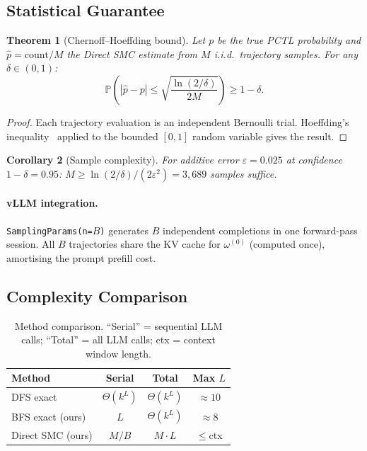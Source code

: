 \documentclass{article}
\newtheorem{theorem}{Theorem}
\newtheorem{corollary}[theorem]{Corollary}
\newcommand{\Prob}{\mathbb{P}}
\newcommand{\eps}{\varepsilon}
\begin{document}
\subsection{Statistical Guarantee}

\begin{theorem}[Chernoff--Hoeffding bound]
\label{thm:chernoff}
Let $p$ be the true PCTL probability and $\hat{p} = \text{count}/M$ the Direct
SMC estimate from $M$ i.i.d.\ trajectory samples.
For any $\delta \in (0,1)$:
\[
  \Prob\!\left(|\hat{p} - p| \le \sqrt{\frac{\ln(2/\delta)}{2M}}\right) \ge 1 - \delta.
\]
\end{theorem}

\begin{proof}
Each trajectory evaluation is an independent Bernoulli trial.
Hoeffding's inequality~\citep{hoeffding1963} applied to the bounded $[0,1]$
random variable gives the result.
\end{proof}

\begin{corollary}[Sample complexity]
For additive error $\eps{=}0.025$ at confidence $1{-}\delta{=}0.95$:
$M \ge \ln(2/\delta)/(2\eps^2) = 3{,}689$ samples suffice.
\end{corollary}

\paragraph{vLLM integration.}
\texttt{SamplingParams(n=}$B$\texttt{)} generates $B$ independent completions
in one forward-pass session.
All $B$ trajectories share the KV cache for $\omega^{(0)}$ (computed once),
amortising the prompt prefill cost.

\subsection{Complexity Comparison}

\begin{table}[tb]
\centering\small
\caption{Method comparison. ``Serial'' = sequential LLM calls;
``Total'' = all LLM calls; ctx = context window length.}
\label{tab:complexity}
\begin{tabular}{lccc}
\toprule
Method & Serial & Total & Max $L$ \\
\midrule
DFS exact~\citep{gross2025llmchecker} & $\Theta(k^L)$ & $\Theta(k^L)$ & ${\approx}10$ \\
BFS exact (ours) & $L$ & $\Theta(k^L)$ & ${\approx}8$ \\
Direct SMC (ours) & $M/B$ & $M{\cdot}L$ & ${\le}$ctx \\
\bottomrule
\end{tabular}
\end{table}
\end{document}
